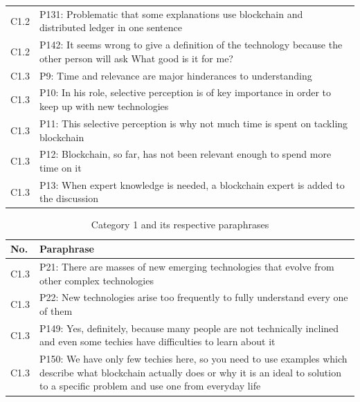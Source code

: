\begin{table}[H]
\begin{tabularx}{\textwidth}{l|X}
	C1.2 & P131: Problematic that some explanations use blockchain and distributed ledger in one sentence \\  
	C1.2 & P142: It seems wrong to give a definition of the technology because the other person will ask What good is it for me?  \\\hline
	C1.3 & P9: Time and relevance are major hinderances to understanding \\  
	C1.3 & P10: In his role, selective perception is of key importance in order to keep up with new technologies \\  
	C1.3 & P11: This selective perception is why not much time is spent on tackling blockchain \\  
	C1.3 & P12: Blockchain, so far, has not been relevant enough to spend more time on it \\  
	C1.3 & P13: When expert knowledge is needed, a blockchain expert is added to the discussion \\ 
\end{tabularx}
\end{table}

\begin{table}[H]
\begin{tabularx}{\textwidth}{l|X}
	No. & Paraphrase \\\hline
	C1.3 & P21: There are masses of new emerging technologies that evolve from other complex technologies \\  
	C1.3 & P22: New technologies arise too frequently to fully understand every one of them \\  
	C1.3 & P149: Yes, definitely, because many people are not technically inclined and even some techies have difficulties to learn about it \\  
	C1.3 & P150: We have only few techies here, so you need to use examples which describe what blockchain actually does or why it is an ideal to solution to a specific problem and use one from everyday life \\  
\end{tabularx}
\caption{Category 1 and its respective paraphrases}
\end{table}


